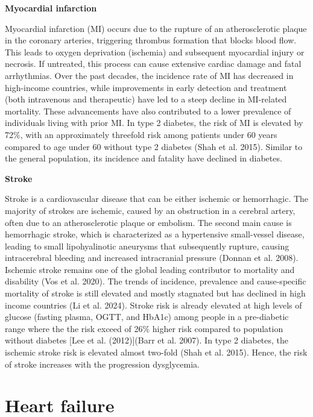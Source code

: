 \documentclass[
  a4paper,
  headsepline=true,
  open=any]{scrbook}
\begin{document}
\textbf{Myocardial infarction}

Myocardial infarction (MI) occurs due to the rupture of an
atherosclerotic plaque in the coronary arteries, triggering thrombus
formation that blocks blood flow. This leads to oxygen deprivation
(ischemia) and subsequent myocardial injury or necrosis. If untreated,
this process can cause extensive cardiac damage and fatal arrhythmias.
Over the past decades, the incidence rate of MI has decreased in
high-income countries, while improvements in early detection and
treatment (both intravenous and therapeutic) have led to a steep decline
in MI-related mortality. These advancements have also contributed to a
lower prevalence of individuals living with prior MI. In type 2
diabetes, the risk of MI is elevated by 72\%, with an approximately
threefold risk among patients under 60 years compared to age under 60
without type 2 diabetes (Shah et al. 2015). Similar to the general
population, its incidence and fatality have declined in diabetes.

\textbf{Stroke}

Stroke is a cardiovascular disease that can be either ischemic or
hemorrhagic. The majority of strokes are ischemic, caused by an
obstruction in a cerebral artery, often due to an atherosclerotic plaque
or embolism. The second main cause is hemorrhagic stroke, which is
characterized as a hypertensive small-vessel disease, leading to small
lipohyalinotic aneurysms that subsequently rupture, causing
intracerebral bleeding and increased intracranial pressure (Donnan et
al. 2008). Ischemic stroke remains one of the global leading contributor
to mortality and disability (Vos et al. 2020). The trends of incidence,
prevalence and cause-specific mortality of stroke is still elevated and
mostly stagnated but has declined in high income countries (Li et al.
2024). Stroke risk is already elevated at high levels of glucose
(fasting plasma, OGTT, and HbA1c) among people in a pre-diabetic range
where the the risk exceed of 26\% higher risk compared to population
without diabetes {[}Lee et al. (2012){]}(Barr et al. 2007). In type 2
diabetes, the ischemic stroke risk is elevated almost two-fold (Shah et
al. 2015). Hence, the risk of stroke increases with the progression
dysglycemia.


\hypertarget{heart-failure}{%
\chapter{Heart failure}\label{heart-failure}}
\end{document}
